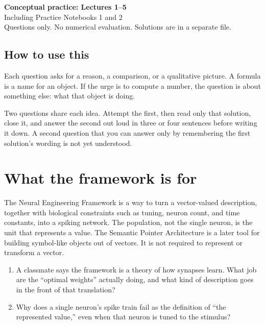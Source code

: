 \documentclass[11pt,letterpaper]{article}
\begin{document}
\begin{center}
{\Large\bfseries Conceptual practice: Lectures 1--5}\\[2pt]
{\large Including Practice Notebooks 1 and 2}\\[4pt]
{\normalsize Questions only. No numerical evaluation. Solutions are in a separate file.}
\end{center}

\subsection*{How to use this}

Each question asks for a reason, a comparison, or a qualitative picture. A formula is a name for an object. If the urge is to compute a number, the question is about something else: what that object is doing.

Two questions share each idea. Attempt the first, then read only that solution, close it, and answer the second out loud in three or four sentences before writing it down. A second question that you can answer only by remembering the first solution's wording is not yet understood.

\section{What the framework is for}

\begin{idea}
The Neural Engineering Framework is a way to turn a vector-valued description, together with biological constraints such as tuning, neuron count, and time constants, into a spiking network. The population, not the single neuron, is the unit that represents a value. The Semantic Pointer Architecture is a later tool for building symbol-like objects out of vectors. It is not required to represent or transform a vector.
\end{idea}

\begin{enumerate}
\item A classmate says the framework is a theory of how synapses learn. What job are the ``optimal weights'' actually doing, and what kind of description goes in the front of that translation?
\item Why does a single neuron's spike train fail as the definition of ``the represented value,'' even when that neuron is tuned to the stimulus?
\end{enumerate}
\end{document}
